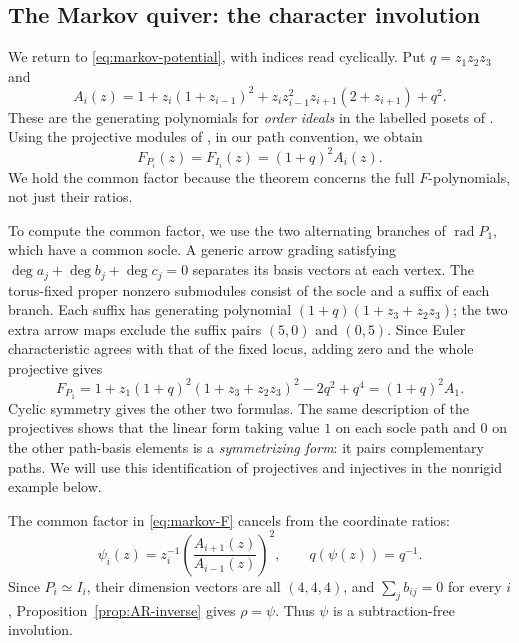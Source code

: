 \documentclass[11pt]{amsart}
\numberwithin{equation}{section}
\theoremstyle{definition}
\theoremstyle{remark}
\newcommand{\op}[1]{\operatorname{#1}}
\begin{document}
\subsection{The Markov quiver: the character involution}\label{subsec:markov-characters}
We return to \eqref{eq:markov-potential}, with indices read cyclically.
Put $q=z_1z_2z_3$ and
\begin{equation}\label{eq:markov-A} A_i(z)=1+z_i(1+z_{i-1})^2+z_iz_{i-1}^2z_{i+1}(2+z_{i+1})+q^2.\end{equation}
These are the generating polynomials for \emph{order ideals} in the
labelled posets of \cite[Example~1.3 and Figure~2]{Wen23}. Using the
projective modules of \cite[Example~4.3]{Pla13}, in our path convention,
we obtain
\begin{equation}\label{eq:markov-F} F_{P_i}(z)=F_{I_i}(z)=(1+q)^2A_i(z).\end{equation}
We hold the common factor because the theorem concerns the full
$F$-polynomials, not just their ratios.

To compute the common factor, we use the two alternating branches of
$\op{rad}P_1$, which have a common socle. A generic arrow grading satisfying
$\deg a_j+\deg b_j+\deg c_j=0$ separates its basis vectors at each
vertex. The torus-fixed proper nonzero submodules consist of the socle
and a suffix of each branch. Each suffix has generating polynomial
$(1+q)(1+z_3+z_2z_3)$; the two extra arrow maps exclude the suffix
pairs $(5,0)$ and $(0,5)$. Since Euler characteristic agrees with
that of the fixed locus, adding zero and the whole projective gives
\[ F_{P_1}=1+z_1(1+q)^2(1+z_3+z_2z_3)^2-2q^2+q^4=(1+q)^2A_1. \]
Cyclic symmetry gives the other two formulas. The same description of the projectives
shows that the linear form taking value $1$ on each socle path and
$0$ on the other path-basis elements is a \emph{symmetrizing form}: it pairs
complementary paths. We will use this identification of projectives and
injectives in the nonrigid example below.

The common factor in \eqref{eq:markov-F} cancels from the coordinate ratios:
\begin{equation}\label{eq:markov-psi} \psi_i(z)=z_i^{-1}\left(\frac{A_{i+1}(z)}{A_{i-1}(z)}\right)^2,\qquad q(\psi(z))=q^{-1}.\end{equation}
Since $P_i\simeq I_i$, their dimension vectors are all $(4,4,4)$,
and $\sum_jb_{ij}=0$ for every $i$, Proposition~\ref{prop:AR-inverse}
gives $\rho=\psi$. Thus $\psi$ is a subtraction-free involution.
\end{document}
